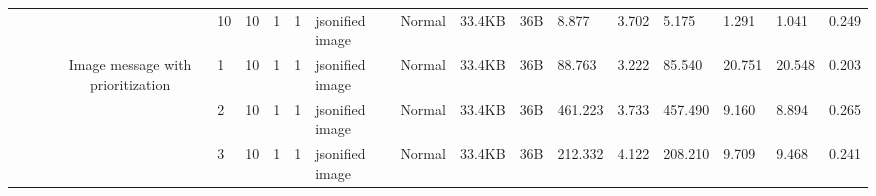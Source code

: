 \begin{landscape}
\begin{table}[]
{\begin{tabular}{@{}ccccllllllllllllll@{}}
                                                                                   &                              &                                &                                                                                                          & 10                                                    & 10                                       & 1                                          & 1                                 & jsonified image                  & Normal                             & 33.4KB                                        & 36B                                             & 8.877                   & 3.702    & 5.175                        & 1.291                   & 1.041    & 0.249                        \\
                                                                                   &                              &                                & \multirow{10}{*}{Image message with prioritization}                                                      & 1                                                     & 10                                       & 1                                          & 1                                 & jsonified image                  & Normal                             & 33.4KB                                        & 36B                                             & 88.763                  & 3.222    & 85.540                       & 20.751                  & 20.548   & 0.203                        \\
                                                                                   &                              &                                &                                                                                                          & 2                                                     & 10                                       & 1                                          & 1                                 & jsonified image                  & Normal                             & 33.4KB                                        & 36B                                             & 461.223                 & 3.733    & 457.490                      & 9.160                   & 8.894    & 0.265                        \\
                                                                                   &                              &                                &                                                                                                          & 3                                                     & 10                                       & 1                                          & 1                                 & jsonified image                  & Normal                             & 33.4KB                                        & 36B                                             & 212.332                 & 4.122    & 208.210                      & 9.709                   & 9.468    & 0.241                        \\

\end{tabular}}
\end{table}
\end{landscape}
